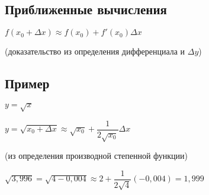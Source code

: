 \subsection{Приближенные вычисления}

$ f(x_{0}+\Delta x)\approx f(x_{0}) + f'(x_{0}) \Delta x $ 

(доказательство из определения дифференциала и $ \Delta y $)

\subsection{Пример}

$ y = \sqrt{x} $

$ y = \sqrt{x_{0} + \Delta x} \approx \sqrt{x_{0}} + \dfrac{1}{2 \sqrt{x_{0}}} \Delta x $

(из определения производной степенной функции)

$ \sqrt{3,996} = \sqrt{4 - 0,004} \approx 2 + \dfrac{1}{2 \sqrt{4} }(-0,004) = 1,999 $
